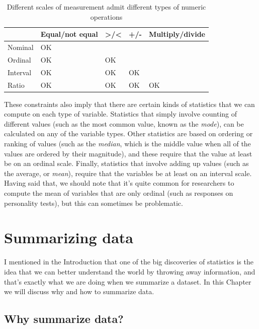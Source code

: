 \documentclass[
  12pt,
]{book}
\begin{document}
\begin{table}

\caption{\label{tab:MeasurementTypes}Different scales of measurement admit different types of numeric operations}
\centering
\begin{tabular}[t]{lllll}
\toprule
  & Equal/not equal & >/< & +/- & Multiply/divide\\
\midrule
Nominal & OK &  &  & \\
Ordinal & OK & OK &  & \\
Interval & OK & OK & OK & \\
Ratio & OK & OK & OK & OK\\
\bottomrule
\end{tabular}
\end{table}

These constraints also imply that there are certain kinds of statistics that we can compute on each type of variable. Statistics that simply involve counting of different values (such as the most common value, known as the \emph{mode}), can be calculated on any of the variable types. Other statistics are based on ordering or ranking of values (such as the \emph{median}, which is the middle value when all of the values are ordered by their magnitude), and these require that the value at least be on an ordinal scale. Finally, statistics that involve adding up values (such as the average, or \emph{mean}), require that the variables be at least on an interval scale. Having said that, we should note that it's quite common for researchers to compute the mean of variables that are only ordinal (such as responses on personality tests), but this can sometimes be problematic.

\hypertarget{summarizing-data}{%
\chapter{Summarizing data}\label{summarizing-data}}

I mentioned in the Introduction that one of the big discoveries of statistics is the idea that we can better understand the world by throwing away information, and that's exactly what we are doing when we summarize a dataset.
In this Chapter we will discuss why and how to summarize data.

\hypertarget{why-summarize-data}{%
\section{Why summarize data?}\label{why-summarize-data}}
\end{document}
